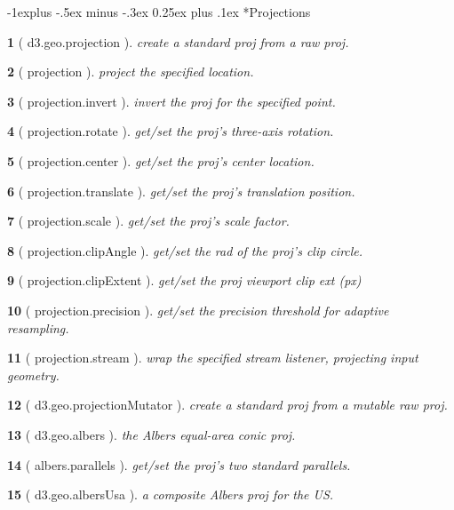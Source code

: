 \documentclass[10pt,landscape,letterpaper]{article}
\makeatletter
\newcounter{thm}
\theoremstyle{mytheoremstyle}
\newtheorem*{thm}{}
\renewcommand{\subsection}{\@startsection{subsection}{2}{0mm}%
                                {-1explus -.5ex minus -.3ex}%
                                {0.25ex plus .1ex}%
                                {\normalfont\normalsize\bfseries}}
\makeatother
\begin{document}
\begin{multicols}{3}
\subsection*{Projections}

\begin{thm} [ d3.geo.projection ]  create a standard proj from a raw proj.
\end{thm}\begin{thm} [ projection ]  project the specified location.
\end{thm}\begin{thm} [ projection.invert ]  invert the proj for the specified point.
\end{thm}\begin{thm} [ projection.rotate ]  get/set the proj's three-axis rotation.
\end{thm}\begin{thm} [ projection.center ]  get/set the proj's center location.
\end{thm}\begin{thm} [ projection.translate ]  get/set the proj's translation position.
\end{thm}\begin{thm} [ projection.scale ]  get/set the proj's scale factor.
\end{thm}\begin{thm} [ projection.clipAngle ]  get/set the rad of the proj's clip circle.
\end{thm}\begin{thm} [ projection.clipExtent ]  get/set the proj viewport clip ext (px)
\end{thm}\begin{thm} [ projection.precision ]  get/set the precision threshold for adaptive resampling.
\end{thm}\begin{thm} [ projection.stream ]  wrap the specified stream listener, projecting input geometry.
\end{thm}\begin{thm} [ d3.geo.projectionMutator ]  create a standard proj from a mutable raw proj.
\end{thm}\begin{thm} [ d3.geo.albers ]  the Albers equal-area conic proj.
\end{thm}\begin{thm} [ albers.parallels ]  get/set the proj's two standard parallels.
\end{thm}\begin{thm} [ d3.geo.albersUsa ]  a composite Albers proj for the US.

\end{thm}
\end{multicols}
\end{document}

